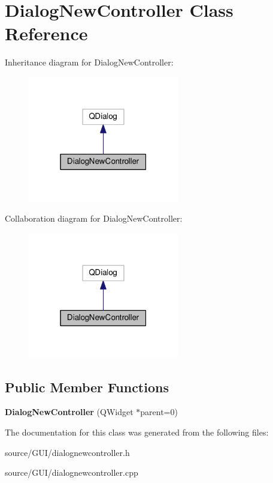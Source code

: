 \section{Dialog\+New\+Controller Class Reference}
\label{class_dialog_new_controller}


Inheritance diagram for Dialog\+New\+Controller\+:\nopagebreak
\begin{figure}[H]
\begin{center}
\leavevmode
\includegraphics[width=187pt]{class_dialog_new_controller__inherit__graph}
\end{center}
\end{figure}


Collaboration diagram for Dialog\+New\+Controller\+:\nopagebreak
\begin{figure}[H]
\begin{center}
\leavevmode
\includegraphics[width=187pt]{class_dialog_new_controller__coll__graph}
\end{center}
\end{figure}
\subsection*{Public Member Functions}
\begin{DoxyCompactItemize}
\item 
{\bfseries Dialog\+New\+Controller} (Q\+Widget $\ast$parent=0)\label{class_dialog_new_controller_a1a9126f1f68f5a0b5ec9e4a205da7f2e}

\end{DoxyCompactItemize}


The documentation for this class was generated from the following files\+:\begin{DoxyCompactItemize}
\item 
source/\+G\+U\+I/dialognewcontroller.\+h\item 
source/\+G\+U\+I/dialognewcontroller.\+cpp\end{DoxyCompactItemize}
